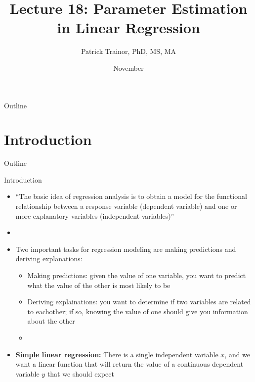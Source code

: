 \documentclass[xcolor=dvipsnames]{beamer}
\title[Lecture 18]{Lecture 18: Parameter Estimation in Linear Regression}
\author[Patrick Trainor]{Patrick Trainor, PhD, MS, MA}
\institute[NMSU]{New Mexico State University}
\date{November}
\begin{document}
\begin{frame}
\maketitle
\end{frame}

\begin{frame}{Outline}
\tableofcontents[hideallsubsections]
\end{frame}

\section{Introduction}
\begin{frame}{Outline}
\tableofcontents[currentsection,subsectionstyle=show/shaded/hide]
\end{frame}

\begin{frame}{Introduction}
	\begin{itemize}
		\item ``The basic idea of regression analysis is to obtain a model for the functional relationship between a response variable (dependent variable) and one or more explanatory variables (independent variables)''
		\item[]
		\item Two important tasks for regression modeling are making predictions and deriving explanations:
		\begin{itemize}
			\item Making predictions: given the value of one variable, you want to predict what the value of the other is most likely to be
			\item Deriving explainations: you want to determine if two variables are related to eachother; if so, knowing the value of one should give you information about the other
			\item[]
		\end{itemize}
		\item \textbf{Simple linear regression:} There is a single independent variable $x$, and we want a linear function that will return the value of a continuous dependent variable $y$ that we should expect
	\end{itemize}
\end{frame}
\end{document}
